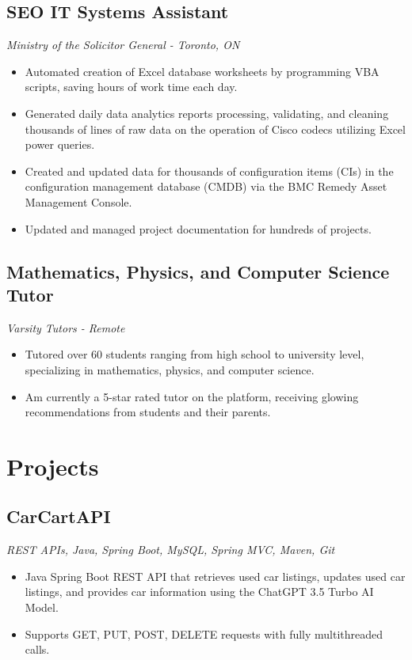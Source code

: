 \documentclass[10pt, a4paper]{article}
\begin{document}
\subsection*{SEO IT Systems Assistant \hfill {}}
\textit{Ministry of the Solicitor General - Toronto, ON}
\begin{itemize}
    \item Automated creation of Excel database worksheets by programming VBA scripts, saving hours of work time each day.
    \item Generated daily data analytics reports processing, validating, and cleaning thousands of lines of raw data on the operation of Cisco codecs utilizing Excel power queries.
    \item Created and updated data for thousands of configuration items (CIs) in the configuration management database (CMDB) via the BMC Remedy Asset Management Console.
    \item Updated and managed project documentation for hundreds of projects.
\end{itemize}

\subsection*{Mathematics, Physics, and Computer Science Tutor \hfill {}}
\textit{Varsity Tutors - Remote}
\begin{itemize}
    \item Tutored over 60 students ranging from high school to university level, specializing in mathematics, physics, and computer science.
    \item Am currently a 5-star rated tutor on the platform, receiving glowing recommendations from students and their parents.
\end{itemize}

\section*{Projects}
\subsection*{CarCartAPI}
\textit{REST APIs, Java, Spring Boot, MySQL, Spring MVC, Maven, Git}
\begin{itemize}
    \item Java Spring Boot REST API that retrieves used car listings, updates used car listings, and provides car information using the ChatGPT 3.5 Turbo AI Model.
    \item Supports GET, PUT, POST, DELETE requests with fully multithreaded calls.
\end{itemize}
\end{document}
